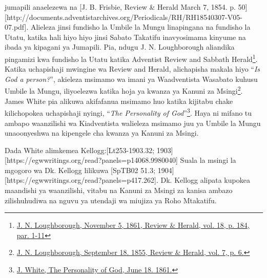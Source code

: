 jumapili anaelezewa na [J. B. Frisbie, Review \& Herald March 7, 1854. p. 50][http://documents.adventistarchives.org/Periodicals/RH/RH18540307-V05-07.pdf]. Alieleza jinsi fundisho la Umbile la Mungu linapingana na fundisho la Utatu, katika hali hiyo hiyo jinsi Sabato Takatifu inavyosimama kinyume na ibada ya kipagani ya Jumapili. Pia, ndugu J. N. Loughborough aliandika pingamizi kwa fundisho la Utatu katika Adventist Review and Sabbath Herald\footnote{\href{https://adventistdigitallibrary.org/adl-349160/advent-review-and-sabbath-herald-november-5-1861}{J. N. Loughborough, November 5, 1861, Review \& Herald, vol. 18, p. 184, par. 1-11}}. Katika uchapishaji mwingine wa Review and Herald, alichapisha makala hiyo “\textit{Is God a person?}”, akieleza msimamo wa imani ya Waadventista Wasabato kuhusu Umbile la Mungu, iliyoelezwa katika hoja ya kwanza ya Kanuni za Msingi\footnote{\href{http://documents.adventistarchives.org/Periodicals/RH/RH18550918-V07-06.pdf}{J. N. Loughborough, September 18. 1855, Review \& Herald, vol. 7, p. 6.}}. James White pia alikuwa akifafanua msimamo huo katika kijitabu chake kilichopokea uchapishaji nyingi, “\textit{The Personality of God}”\footnote{\href{https://egwwritings.org/?ref=en_PERGO.1.1&para=1471.3}{J. White, The Personality of God, June 18. 1861.}}. Haya ni mifano tu ambapo waanzilishi wa Kiadventista walieleza msimamo juu ya Umbile la Mungu unaoonyeshwa na kipengele cha kwanza ya Kanuni za Msingi.

Dada White alimkemea Kellogg:[Lt253-1903.32; 1903][https://egwwritings.org/read?panels=p14068.9980040] Suala la msingi la mgogoro wa Dk. Kellogg lilikuwa [SpTB02 51.3; 1904][https://egwwritings.org/read?panels=p417.262]. Dk. Kellogg alipata kupokea maandishi ya waanzilishi, vitabu na Kanuni za Msingi za kanisa ambazo zilishuhudiwa na nguvu ya utendaji wa miujiza ya Roho Mtakatifu.


